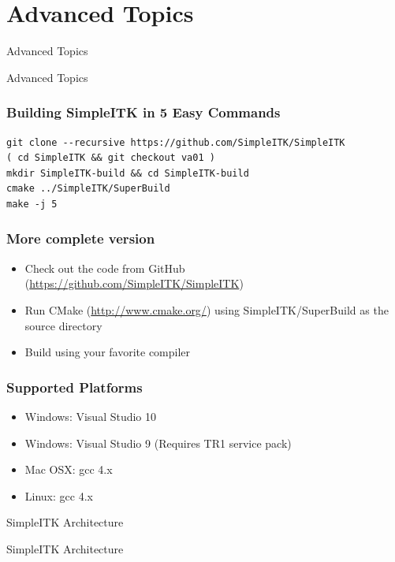 \section{Advanced Topics}
\begin{frame}{Advanced Topics}
\fontsize{36pt}{36pt}\selectfont
\center
\begin{center}
Advanced Topics
\end{center}
\end{frame}

\begin{frame}[fragile]
\frametitle{Building SimpleITK in 5 Easy Commands}
\small
\begin{verbatim}
git clone --recursive https://github.com/SimpleITK/SimpleITK
( cd SimpleITK && git checkout va01 )
mkdir SimpleITK-build && cd SimpleITK-build
cmake ../SimpleITK/SuperBuild
make -j 5
\end{verbatim}
\normalsize
\end{frame}

\begin{frame}[fragile]
\frametitle{More complete version}
\begin{itemize}
  \item Check out the code from GitHub (\url{https://github.com/SimpleITK/SimpleITK})
  \item Run CMake (\url{http://www.cmake.org/}) using SimpleITK/SuperBuild as the source directory
  \item Build using your favorite compiler
\end{itemize}
\end{frame}

\begin{frame}[fragile]
\frametitle{Supported Platforms}
\begin{itemize}
  \item Windows: Visual Studio 10
  \item Windows: Visual Studio 9 (Requires TR1 service pack)
  \item Mac OSX: gcc 4.x
  \item Linux: gcc 4.x
\end{itemize}
\end{frame}

\begin{frame}{SimpleITK Architecture}
\fontsize{36pt}{36pt}\selectfont
\center
\begin{center}
SimpleITK Architecture
\end{center}
\end{frame}


